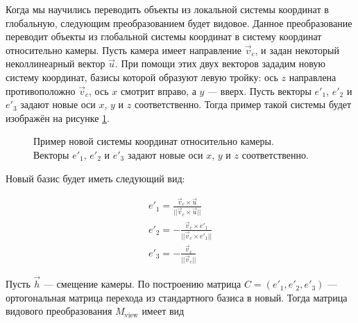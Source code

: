 \documentclass{article}
\begin{document}
Когда мы научились переводить объекты из локальной системы координат в глобальную, следующим преобразованием будет видовое.
Данное преобразование переводит объекты из глобальной системы координат в систему координат относительно камеры.
Пусть камера имеет направление $\vec{v}_{c}$, и задан некоторый неколлинеарный вектор $\vec{u}$.
При помощи этих двух векторов зададим новую систему координат, базисы которой образуют левую тройку: ось $z$ направлена противоположно $\vec{v}_{c}$, ось $x$ смотрит вправо, а $y$ --- вверх.
Пусть векторы $e'_{1}$, $e'_{2}$ и $e'_{3}$ задают новые оси $x$, $y$ и $z$ соответственно.
Тогда пример такой системы будет изображён на рисунке \ref{camera axes}.

\begin{figure}[ht]
    \caption{Пример новой системы координат относительно камеры. \\ Векторы $e'_{1}$, $e'_{2}$ и $e'_{3}$ задают новые оси $x$, $y$ и $z$ соответственно.}
    \label{camera axes}
\end{figure}

Новый базис будет иметь следующий вид:

\begin{gather*}
	e'_{1} = \frac{\vec{v}_{c} \times \vec{u}}{||\vec{v}_{c} \times \vec{u}||} \\
	e'_{2} = -\frac{\vec{v}_{c} \times e'_1}{||\vec{v}_{c} \times e'_1||} \\
	e'_{3} = -\frac{\vec{v}_{c}}{||\vec{v}_{c}||}
\end{gather*}

Пусть $\vec{h}$ --- смещение камеры.
По построению матрица $C = (e'_{1}, e'_{2}, e'_{3})$ --- ортогональная матрица перехода из стандартного базиса в новый.
Тогда матрица видового преобразования $M_{\text{view}}$ имеет вид
\end{document}
